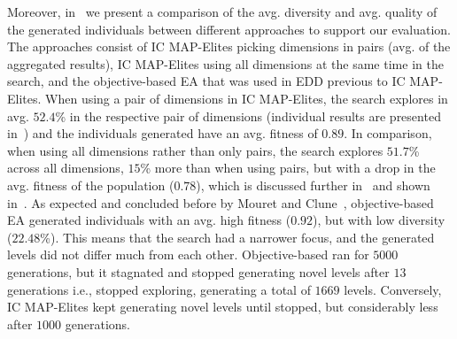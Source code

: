 Moreover, in~ we present a comparison of the avg. diversity and avg. quality of the generated individuals between different approaches to support our evaluation. The approaches consist of IC MAP-Elites picking dimensions in pairs (avg. of the aggregated results), IC MAP-Elites using all dimensions at the same time in the search, and the objective-based EA that was used in EDD previous to IC MAP-Elites. When using a pair of dimensions in IC MAP-Elites, the search explores in avg. $52.4$\% in the respective pair of dimensions (individual results are presented in~) and the individuals generated have an avg. fitness of $0.89$. In comparison, when using all dimensions rather than only pairs, the search explores $51.7$\% across all dimensions, $15$\% more than when using pairs, but with a drop in the avg. fitness of the population ($0.78$), which is discussed further in~ and shown in~. As expected and concluded before by Mouret and Clune~, objective-based EA generated individuals with an avg. high fitness ($0.92$), but with low diversity ($22.48$\%). This means that the search had a narrower focus, and the generated levels did not differ much from each other. Objective-based ran for $5000$ generations, but it stagnated and stopped generating novel levels after $13$ generations i.e., stopped exploring, generating a total of $1669$ levels. Conversely, IC MAP-Elites kept generating novel levels until stopped, but considerably less after $1000$ generations.



